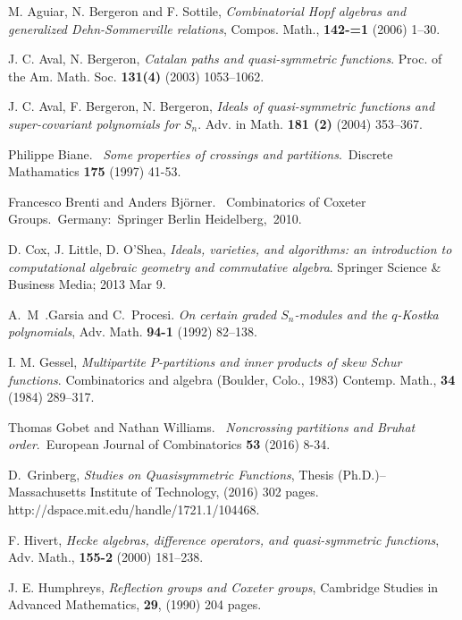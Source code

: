 \documentclass[12pt]{amsart}
\theoremstyle{definition}
\theoremstyle{remark}
\numberwithin{equation}{section}
\begin{document}
\begin{thebibliography}{99}

 M. Aguiar, N. Bergeron and F. Sottile,
\textit{Combinatorial {H}opf algebras and generalized
              {D}ehn-{S}ommerville relations},
{Compos. Math.},
 {\bf 142-=1} (2006) 1--30.


 J. C. Aval, N. Bergeron,
\textit{Catalan paths and quasi-symmetric functions}.
Proc. of the Am. Math. Soc. {\bf 131(4)} (2003) 1053--1062.

 J. C. Aval, F. Bergeron, N. Bergeron,
\textit{Ideals of quasi-symmetric functions and super-covariant polynomials for $S_n$}.
Adv. in Math. {\bf 181 (2)} (2004) 353--367.

  Philippe Biane.  \textit{Some properties of crossings and partitions}. Discrete Mathamatics {\bf 175} (1997) 41-53.

  Francesco Brenti and Anders Bj\"{o}rner.  Combinatorics of Coxeter Groups. Germany: Springer Berlin Heidelberg, 2010.


 D. Cox, J. Little, D. O'Shea,
\textit{Ideals, varieties, and algorithms: an introduction to computational
algebraic geometry and commutative algebra}.
Springer Science \& Business Media; 2013 Mar 9.

 A.~M~.Garsia and C.~Procesi.
\textit{On certain graded {$S_n$}-modules and the {$q$}-{K}ostka
              polynomials},
 {Adv. Math.}
 {\bf 94-1} (1992)  82--138.
 
 I. M. Gessel,
\textit{Multipartite {$P$}-partitions and inner products of skew
              {S}chur functions}.
{Combinatorics and algebra ({B}oulder, {C}olo., 1983)} 
{Contemp. Math.}, {\bf 34} (1984)
    289--317.
    
    
  Thomas Gobet and Nathan Williams.  \textit{Noncrossing partitions and Bruhat order}. European Journal of Combinatorics {\bf 53} (2016) 8-34.

 D.~Grinberg, 
 \textit{Studies on {Q}uasisymmetric {F}unctions},
{Thesis (Ph.D.)--Massachusetts Institute of Technology},
 (2016) 302 pages.
http://dspace.mit.edu/handle/1721.1/104468.

 F. Hivert,
\textit{Hecke algebras, difference operators, and quasi-symmetric functions},
 {Adv. Math.},
{\bf 155-2} (2000) 181--238.

 J. E. Humphreys,   \textit{Reflection groups and {C}oxeter groups},
 {Cambridge Studies in Advanced Mathematics},
{\bf 29},
(1990) 204 pages.


\end{thebibliography}
\end{document}
